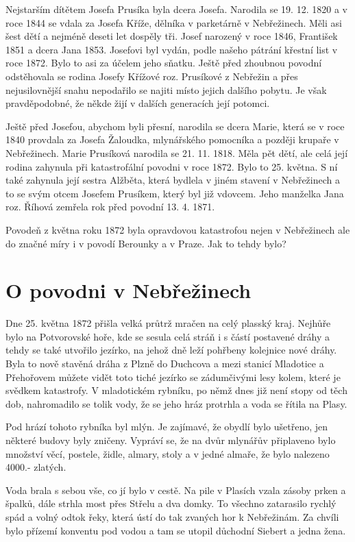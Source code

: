 \documentclass[../dejiny-rodu-prusiku.tex]{subfiles}
\begin{document}
Nejstarším dítětem Josefa Prusíka byla dcera Josefa. Narodila se 19. 12. 1820 a v roce 1844 se vdala za Josefa Kříže, dělníka v parketárně v Nebřežinech. Měli asi šest dětí a nejméně deseti let dospěly tři. Josef narozený v roce 1846, František 1851 a dcera Jana 1853. Josefovi byl
vydán, podle našeho pátrání křestní list v roce 1872. Bylo to asi za účelem jeho sňatku. Ještě před zhoubnou povodní odstěhovala se rodina Josefy Křížové roz. Prusíkové z Nebřežin a přes nejusilovnější snahu nepodaři­lo se najiti místo jejich dalšího pobytu. Je však pravdě­podobné, že někde žijí v dalších generacích její potom­ci.

Ještě před Josefou, abychom byli přesní, narodila se dcera Marie, která se v roce 1840 provdala za Josefa Žaloudka, mlynářského pomocníka a později krupaře v Nebřežinech. Marie Prusíková narodila se 21. 11. 1818. Měla pět dětí, ale celá její rodina zahynula při kata­strofální povodni v roce 1872. Bylo to 25. května. S ní také zahynula její sestra Alžběta, která bydlela v jiném stavení v Nebřežinech a to se svým otcem Josefem Prusíkem, který byl již vdovcem. Jeho manželka Jana roz. Říhová zemřela rok před povodní 13. 4. 1871.

Povodeň z května roku 1872 byla opravdovou katastrofou nejen v Nebřežinech ale do značné míry i v povodí Be­rounky a v Praze. Jak to tehdy bylo?

\section{O povodni v Nebřežinech}
Dne 25. května 1872 přišla velká průtrž mračen na celý plasský kraj. Nejhůře bylo na Potvorovské hoře, kde se sesula celá stráň i s částí postavené dráhy a tehdy se také utvořilo jezírko, na jehož dně leží pohřbeny kolej­nice nové dráhy. Byla to nově stavěná dráha z Plzně do Duchcova a mezi stanicí Mladotice a Přehořovem můžete vidět toto tiché jezírko se zádumčivými lesy kolem, které je svědkem katastrofy. V mladotickém rybníku, po němž dnes již není stopy od těch dob, nahromadilo se tolik vo­dy, že se jeho hráz protrhla a voda se řítila na Plasy.

Pod hrází tohoto rybníka byl mlýn. Je zajímavé, že obydlí bylo ušetřeno, jen některé budovy byly zničeny. Vyprá­ví se, že na dvůr mlynářův připlaveno bylo množství věcí, postele, židle, almary, stoly a v jedné almaře, že bylo nalezeno 4000.- zlatých.

Voda brala s sebou vše, co jí bylo v cestě. Na pile v Pla­sích vzala zásoby prken a špalků, dále strhla most přes Střelu a dva domky. To všechno zatarasilo rychlý spád a volný odtok řeky, která ústí do tak zvaných hor k Nebřežinám. Za chvíli bylo přízemí konventu pod vodou a tam se utopil důchodní Siebert a jedna žena.
\end{document}
